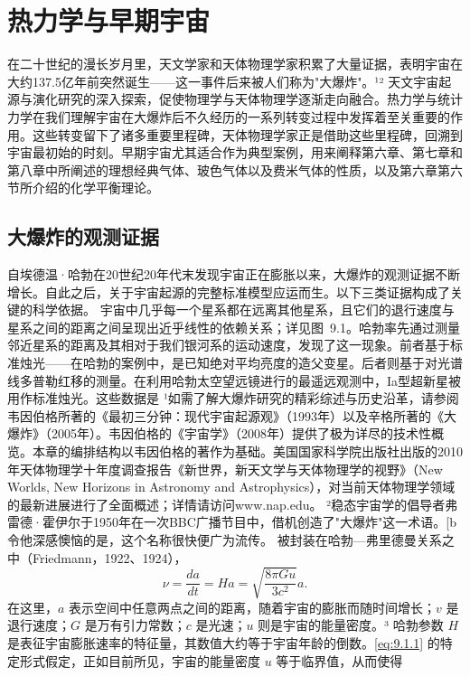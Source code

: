 ﻿\chapter{热力学与早期宇宙}\label{ux70edux529bux5b66ux4e0eux65e9ux671fux5b87ux5b99}

在二十世纪的漫长岁月里，天文学家和天体物理学家积累了大量证据，表明宇宙在大约137.5亿年前突然诞生——这一事件后来被人们称为"大爆炸"。¹² 天文宇宙起源与演化研究的深入探索，促使物理学与天体物理学逐渐走向融合。热力学与统计力学在我们理解宇宙在大爆炸后不久经历的一系列转变过程中发挥着至关重要的作用。这些转变留下了诸多重要里程碑，天体物理学家正是借助这些里程碑，回溯到宇宙最初始的时刻。早期宇宙尤其适合作为典型案例，用来阐释第六章、第七章和第八章中所阐述的理想经典气体、玻色气体以及费米气体的性质，以及第六章第六节所介绍的化学平衡理论。
\section{大爆炸的观测证据}\label{ux5927ux7206ux70b8ux7684ux89c2ux6d4bux8bc1ux636e}
自埃德温·哈勃在20世纪20年代末发现宇宙正在膨胀以来，大爆炸的观测证据不断增长。自此之后，关于宇宙起源的完整标准模型应运而生。以下三类证据构成了关键的科学依据。
宇宙中几乎每一个星系都在远离其他星系，且它们的退行速度与星系之间的距离之间呈现出近乎线性的依赖关系；详见图~9.1。哈勃率先通过测量邻近星系的距离及其相对于我们银河系的运动速度，发现了这一现象。前者基于标准烛光——在哈勃的案例中，是已知绝对平均亮度的造父变星。后者则基于对光谱线多普勒红移的测量。在利用哈勃太空望远镜进行的最遥远观测中，Ia型超新星被用作标准烛光。这些数据是
¹如需了解大爆炸研究的精彩综述与历史沿革，请参阅韦因伯格所著的《最初三分钟：现代宇宙起源观》（1993年）以及辛格所著的《大爆炸》（2005年）。韦因伯格的《宇宙学》（2008年）提供了极为详尽的技术性概览。本章的编排结构以韦因伯格的著作为基础。美国国家科学院出版社出版的2010年天体物理学十年度调查报告《新世界，新天文学与天体物理学的视野》（New Worlds, New Horizons in Astronomy and Astrophysics），对当前天体物理学领域的最新进展进行了全面概述；详情请访问www.nap.edu。
²稳态宇宙学的倡导者弗雷德·霍伊尔于1950年在一次BBC广播节目中，借机创造了"大爆炸"这一术语。{[}b 令他深感懊恼的是，这个名称很快便广为流传。
被封装在哈勃---弗里德曼关系之中（Friedmann，1922、1924），
\begin{equation}\tag{9.1.1}\label{eq:9.1.1}
\nu = { \frac { d a } { d t } } = H a = { \sqrt { \frac { 8 \pi G u } { 3 c ^{2} } } } a .
\end{equation}
在这里，\(a\) 表示空间中任意两点之间的距离，随着宇宙的膨胀而随时间增长；\(v\) 是退行速度；\(G\) 是万有引力常数；\(c\) 是光速；\(u\) 则是宇宙的能量密度。³ 哈勃参数 \(H\) 是表征宇宙膨胀速率的特征量，其数值大约等于宇宙年龄的倒数。\autoref{eq:9.1.1} 的特定形式假定，正如目前所见，宇宙的能量密度 \(u\) 等于临界值，从而使得
